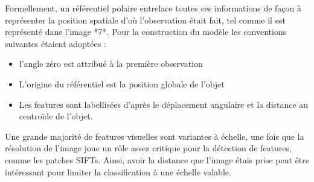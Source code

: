 Formellement, un référentiel polaire entrelace toutes ces informations
de façon à représenter la position spatiale d'où l'observation était
fait, tel comme il est représenté dans l'image *7*. Pour la
construction du modèle les conventions suivantes étaient adoptées :
\begin{itemize}
\item l'angle zéro est attribué à la première observation
\item L'origine du référentiel est la position globale de l’objet
\item Les features sont labellisées d'après le déplacement angulaire
  et la distance au centroïde de l'objet.
\end{itemize}

Une grande majorité de features visuelles sont variantes à échelle, une
fois que la résolution de l’image joue un rôle assez critique pour la
détection de features, comme les patches SIFTs. Ainsi, avoir la distance
que l’image étais prise peut être intéressant pour limiter la
classification à une échelle valable.